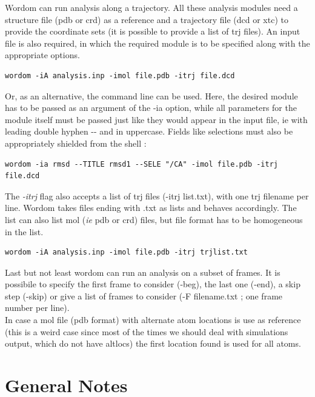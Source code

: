 \documentclass[11pt,twoside,onecolumn,a4paper,openright,notitlepage]{book}[2001/04/21]
\begin{document}
Wordom can run analysis along a trajectory. All these analysis modules need a structure file (pdb or crd) as a reference and a trajectory file (dcd or xtc) to provide the coordinate sets (it is possible to provide a list of trj files). An input file is also required, in which the required module is to be specified along with the appropriate options.

\begin{verbatim}
wordom -iA analysis.inp -imol file.pdb -itrj file.dcd
\end{verbatim}

Or, as an alternative, the command line can be used. Here, the desired module has to be passed as an argument of the -ia option, while all parameters for the module itself must be passed just like they would appear in the input file, ie with leading double hyphen -{}- and in uppercase. Fields like selections must also be appropriately shielded from the shell :

\begin{verbatim}
wordom -ia rmsd --TITLE rmsd1 --SELE "/CA" -imol file.pdb -itrj file.dcd
\end{verbatim}

The \emph{-itrj} flag also accepts a list of trj files (-itrj list.txt), with one trj filename per line. Wordom takes files ending with .txt as lists and behaves accordingly. The list can also list mol (\emph{ie} pdb or crd) files, but file format has to be homogeneous in the list.

\begin{verbatim}
wordom -iA analysis.inp -imol file.pdb -itrj trjlist.txt
\end{verbatim}

Last but not least wordom can run an analysis on a subset of frames. It is possibile to specify the first frame to consider (-beg), the last one (-end), a skip step (-skip) or give a list of frames to consider (-F filename.txt ; one frame number per line).\\

In case a mol file (pdb format) with alternate atom locations is use as reference (this is a weird case since most of the times we should deal with simulations output, which do not have altlocs) the first location found is used for all atoms.\\

\section{General Notes}
\end{document}

